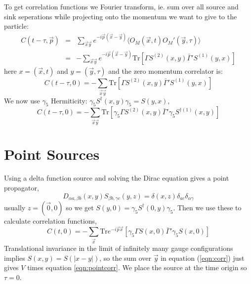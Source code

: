 \documentclass[3p,preprint]{elsarticle}
\begin{document}
To get correlation functions we Fourier transform, ie. sum over all source and sink seperations
while projecting onto the momentum we want to give to the particle:
\begin{eqnarray}
C(t - \tau, \vec{p}) &=& \sum_{\vec{x} \vec{y}} e^{-i \vec{p}(\vec{x} - \vec{y}) } \langle O_M(\vec{x}, t) O_M'(\vec{y}, \tau)\rangle \\
&=& -\sum_{\vec{x} \vec{y}} e^{-i \vec{p}(\vec{x} - \vec{y}) } \text{Tr}\left[ \Gamma S^{(2)} (x,y) \bar{ \Gamma }' S^{(1)} (y,x) \right]
\end{eqnarray}
here $x = (\vec{x}, t)$ and $y = (\vec{y}, \tau)$ and the zero momentum correlator is:
\begin{equation}
C(t - \tau, 0) = -\sum_{\vec{x} \vec{y}} \text{Tr}\left[ \Gamma S^{(2)} (x,y) \bar{ \Gamma }' S^{(1)} (y,x) \right]
\end{equation}
We now use $\gamma_5$ Hermiticity: $\gamma_5 S^\dagger(x,y) \gamma_5 = S(y,x)$,
\begin{equation}\label{eqn:corr}
C(t - \tau, 0) = -\sum_{\vec{x} \vec{y}} \text{Tr}\left[ \gamma_5 \Gamma S^{(2)} (x,y) \bar{ \Gamma }' \gamma_5 S^{\dagger (1)} (x,y) \right]
\end{equation}

\section{Point Sources}
Using a delta function source and solving the Dirac equation gives a point propagator,
\begin{equation}
	D_{\alpha a, \beta b} (x,y) S_{\beta b, \gamma c} (y, z) = \delta(x,z) \delta_{ac} \delta_{\alpha \gamma}
\end{equation}
usually $z = (\vec{0}, 0)$ so we get $S(y,0) = \gamma_5 S^{\dagger} (0,y) \gamma_5$. Then we use these to calculate
correlation functions,
\begin{equation}\label{eqn:pointcorr}
C(t, 0) = -\sum_{\vec{x}} \text{Tr} e^{-i \vec{p} \vec{x}} \left[ \gamma_5 \Gamma S (x,0) \bar{ \Gamma }' \gamma_5 S (x,0) \right]
\end{equation}
Translational invariance in the limit of infinitely many gauge configurations implies
$S(x,y) = S(|x - y|)$, so the sum over $\vec{y}$ in equation (\ref{eqn:corr}) just gives $V$ times equation
\ref{eqn:pointcorr}.  We place the source at the time origin so $\tau = 0$.
\end{document}
